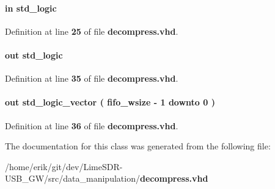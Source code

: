\paragraph[{wclk}]{ {\bfseries \textcolor{keywordflow}{in}\textcolor{vhdlchar}{ }} {\bfseries \textcolor{comment}{std\+\_\+logic}\textcolor{vhdlchar}{ }} \hspace{0.3cm}{\ttfamily [Port]}}\label{classdecompress_adc5d3b386b1979488fb85997e33fbd78}


Definition at line {\bf 25} of file {\bf decompress.\+vhd}.

\paragraph[{wfull}]{ {\bfseries \textcolor{keywordflow}{out}\textcolor{vhdlchar}{ }} {\bfseries \textcolor{comment}{std\+\_\+logic}\textcolor{vhdlchar}{ }} \hspace{0.3cm}{\ttfamily [Port]}}\label{classdecompress_aee76d1b947eae4b96a162ce08a32e4c2}


Definition at line {\bf 35} of file {\bf decompress.\+vhd}.

\paragraph[{wusedw}]{ {\bfseries \textcolor{keywordflow}{out}\textcolor{vhdlchar}{ }} {\bfseries \textcolor{comment}{std\+\_\+logic\+\_\+vector}\textcolor{vhdlchar}{ }\textcolor{vhdlchar}{(}\textcolor{vhdlchar}{ }\textcolor{vhdlchar}{ }\textcolor{vhdlchar}{ }\textcolor{vhdlchar}{ }{\bfseries {\bf fifo\+\_\+wsize}} \textcolor{vhdlchar}{-\/}\textcolor{vhdlchar}{ } \textcolor{vhdldigit}{1} \textcolor{vhdlchar}{ }\textcolor{keywordflow}{downto}\textcolor{vhdlchar}{ }\textcolor{vhdlchar}{ } \textcolor{vhdldigit}{0} \textcolor{vhdlchar}{ }\textcolor{vhdlchar}{)}\textcolor{vhdlchar}{ }} \hspace{0.3cm}{\ttfamily [Port]}}\label{classdecompress_af04525979ea92725a1aa58fb1a1a3579}


Definition at line {\bf 36} of file {\bf decompress.\+vhd}.



The documentation for this class was generated from the following file\+:\begin{DoxyCompactItemize}
\item 
/home/erik/git/dev/\+Lime\+S\+D\+R-\/\+U\+S\+B\+\_\+\+G\+W/src/data\+\_\+manipulation/{\bf decompress.\+vhd}\end{DoxyCompactItemize}
